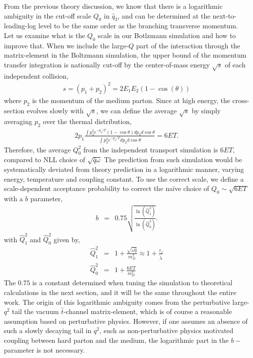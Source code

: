 From the previous theory discussion, we know that there is a logarithmic ambiguity in the cut-off scale $Q_0$ in $\hat{q}_3$, and can be determined at the next-to-leading-log level to be the same order as the branching transverse momentum.
Let us examine what is the $Q_0$ scale in our Botlzmann simulation and how to improve that.
When we include the large-$Q$ part of the interaction through the matrix-element in the Boltzmann simulation, the upper bound of the momentum transfer integration is nationally cut-off by the center-of-mass energy $\sqrt{s}$ of each independent collision,
\begin{eqnarray}
s = (p_1 + p_2)^2 = 2E_1 E_2 (1-\cos(\theta))
\end{eqnarray}
where $p_2$ is the momentum of the medium parton.
Since at high energy, the cross-section evolves slowly with $\sqrt{s}$, we can define the average $\sqrt{s}$ by simply averaging $p_2$ over the thermal distribution,
\begin{eqnarray}
2p_1\frac{ \int p_2^3 e^{-p_2/T}(1-\cos\theta) dp_2 d\cos \theta }{\int p_2^2 e^{-p_2/T} dp_2 d\cos \theta} =  6ET.
\end{eqnarray}
Therefore, the average $Q_0^2$ from the independent transport simulation is $6ET$, compared to NLL choice of $\sqrt{\hat{q} \omega}$
The prediction from such simulation would be systematically deviated from theory prediction in a logarithmic manner, varying energy, temperature and coupling constant.
To use the correct scale, we define a scale-dependent acceptance probability to correct the na\"ive choice of $Q_0 \sim \sqrt{6ET}$ with a $b$ parameter,
\begin{eqnarray}
b &=& 0.75\sqrt{\frac{\ln(\hat{Q}_1^2 )}{\ln(\hat{Q}_0^2 )}}.
\label{eq:NLL-b}
\end{eqnarray}
with $\hat{Q}_1^2$ and $\hat{Q}_0^2$ given by,
\begin{eqnarray}
\hat{Q}_1^2 &=& 1 + \frac{\sqrt{\omega\hat{q}}}{m_D^2} \approx 1 + \frac{\tau_f}{\tilde{\lambda}}\\
\hat{Q}_0^2 &=& 1 + \frac{6ET}{m_D^2}
\end{eqnarray}
The $0.75$ is a constant determined when tuning the simulation to theoretical calculations in the next section, and it will be the same throughout the entire work.
The origin of this logarithmic ambiguity comes from the perturbative large-$q^2$ tail the vacuum $\hat{t}$-channel matrix-element, which is of course a reasonable assumption based on perturbative physics. 
However, if one assumes an absence of such a slowly decaying tail in $q^2$, such as non-perturbative physics motivated coupling between hard parton and the medium, the logarithmic part in the $b-$parameter is not necessary.

